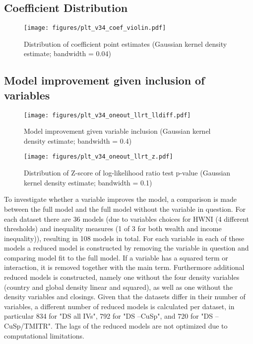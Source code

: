 \documentclass[11pt, authoryear]{elsarticle}
\begin{document}
\subsection{Coefficient Distribution}
\label{app_coefdrbn}
\begin{figure}[htbp]
\centering
\texttt{[image: figures/plt\_v34\_coef\_violin.pdf]}
\caption{\label{fig:coef_violin}Distribution of coefficient point estimates (Gaussian kernel density estimate; bandwidth = 0.04)}
\end{figure}

\FloatBarrier


\subsection{Model improvement given inclusion of variables}
\label{app_llrt}
\begin{figure}[htbp]
\centering
\texttt{[image: figures/plt\_v34\_oneout\_llrt\_lldiff.pdf]}
\caption{\label{fig:oneout_llrt_lldiff}Model improvement given variable inclusion (Gaussian kernel density estimate; bandwidth = 0.4)}
\end{figure}



\begin{figure}[htbp]
\centering
\texttt{[image: figures/plt\_v34\_oneout\_llrt\_z.pdf]}
\caption{\label{fig:oneout_llrt_z}Distribution of Z-score of log-likelihood ratio test p-value (Gaussian kernel density estimate; bandwidth = 0.1)}
\end{figure}

To investigate whether a variable improves the model, a comparison is made between the full model and the full model without the variable in question.
For each dataset there are 36 models (due to variables choices for HWNI (4 different thresholds) and inequality measures (1 of 3 for both wealth and income inequality)), resulting in 108 models in total. 
For each variable in each of these models a reduced model is constructed by removing the variable in question and comparing model fit to the full model.
If a variable has a squared term or interaction, it is removed together with the main term.
Furthermore additional reduced models is constructed, namely one without the four density variables (country and global density linear and squared), as well as one without the density variables and closings.
Given that the datasets differ in their number of variables, a different number of reduced models is calculated per dataset, in particular 834 for "DS all IVs", 792 for "DS --CuSp", and 720 for "DS --CuSp/TMITR". 
The lags of the reduced models are not optimized due to computational limitations. 
\end{document}
